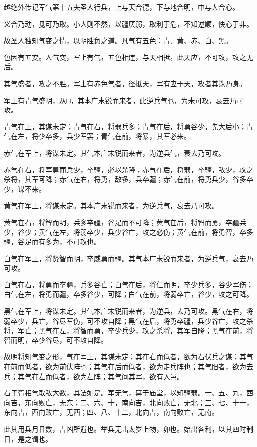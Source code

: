 \documentclass[12pt,UTF8]{ctexbook}
\begin{document}
越绝外传记军气第十五夫圣人行兵，上与天合德，下与地合明，中与人合心。

义合乃动，见可乃取。小人则不然，以疆厌弱，取利于危，不知逆顺，快心于非。

故圣人独知气变之情，以明胜负之道。凡气有五色：青、黄、赤、白、黑。

色因有五变。人气变，军上有气，五色相连，与天相抵。此天应，不可攻，攻之无后。

其气盛者，攻之不胜。军上有赤色气者，径抵天，军有应于天，攻者其诛乃身。

军上有青气盛明，从□，其本广末锐而来者，此逆兵气也，为未可攻，衰去乃可攻。

青气在上，其谋未定；青气在右，将弱兵多；青气在后，将勇谷少，先大后小；青气在左，将少卒多，兵少军罢；青气在前，将暴，其军必来。

赤气在军上，将谋未定。其气本广末锐而来者，为逆兵气，衰去乃可攻。

赤气在右，将军勇而兵少，卒疆，必以杀降；赤气在后，将弱，卒疆，敌少，攻之杀将，其军可降；赤气在右，将勇，敌多，兵卒疆；赤气在前，将勇兵少，谷多卒少，谋不来。

黄气在军上，将谋未定。其本广末锐而来者，为逆兵气，衰去乃可攻。

黄气在右，将智而明，兵多卒疆，谷足而不可降；黄气在后，将智而勇，卒疆兵少，谷少；黄气在左，将弱卒少，兵少谷亡，攻之必伤；黄气在前，将勇智，卒多疆，谷足而有多为，不可攻也。

白气在军上，将贤智而明，卒威勇而疆。其气本广末锐而来者，为逆兵气，衰去乃可攻。

白气在右，将勇而卒疆，兵多谷亡；白气在后，将仁而明，卒少兵多，谷少军伤；白气在左，将勇而疆，卒多谷少，可降；白气在前，将弱卒亡，谷少，攻之可降。

黑气在军上，将谋未定。其气本广末锐而来者，为逆兵，去乃可攻。黑气在右，将弱卒少，兵亡，谷尽军伤，可不攻自降；黑气在后，将勇卒疆，兵少谷亡，攻之杀将，军亡；黑气在左，将智而勇，卒少兵少，攻之杀将，其军自降；黑气在前，将智而明，卒少谷尽，可不攻自降。

故明将知气变之形，气在军上，其谋未定；其在右而低者，欲为右伏兵之谋；其气在前而低者，欲为前伏阵也；其气在后而低者，欲为走兵阵也；其气阳者，欲为去兵；其气在左而低者，欲为左阵；其气间其军，欲有入邑。

右子胥相气取敌大数，其法如是。军无气，算于庙堂，以知疆弱。一、五、九，西向吉，东向败亡，无东；二、六、十，南向吉，北向败亡，无北；三、七、十一，东向吉，西向败亡，无西；四、八、十二，北向吉，南向败亡，无南。

此其用兵月日数，吉凶所避也。举兵无击太岁上物，卯也。始出各利，以其四时制日，是之谓也。
\end{document}
